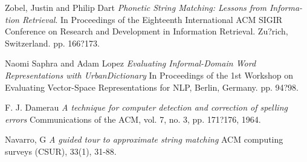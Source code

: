 \documentclass[11pt]{article}
\begin{document}
\begin{thebibliography}{9}
\bibitem{} 
Zobel, Justin and Philip Dart
\textit{Phonetic String Matching: Lessons from Informa-tion Retrieval}. 
In Proceedings of the Eighteenth International ACM SIGIR Conference on Research and Development in Information Retrieval. Zu?rich, Switzerland. pp. 166?173.
 
\bibitem{} 
Naomi Saphra and Adam Lopez
\textit{Evaluating Informal-Domain Word Representations with UrbanDictionary}
In Proceedings of the 1st Workshop on Evaluating Vector-Space Representations for NLP, Berlin, Germany. pp. 94?98.

\bibitem{} 
F. J. Damerau
\textit{A technique for computer detection and correction of spelling errors}
Communications of the ACM, vol. 7, no. 3, pp. 171?176, 1964.

\bibitem{} 
Navarro, G
\textit{A guided tour to approximate string matching}
ACM computing surveys (CSUR), 33(1), 31-88.

\end{thebibliography}
\end{document}
